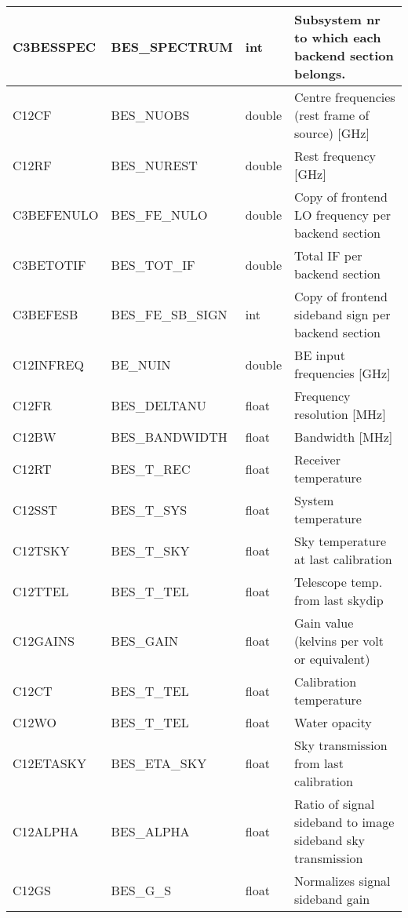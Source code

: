 \documentclass[twoside,11pt,nolof]{starlink}
\begin{document}
\begin {longtable}{|p{38mm}|p{42mm}|p{11mm}|p{55mm}|}
\hline \label{GSDVars:BESubsys}C3BESSPEC & BES\_SPECTRUM & int & Subsystem nr to which each backend section belongs.\\
\hline \label{GSDVars:centreFreqs}C12CF & BES\_NUOBS & double & Centre frequencies (rest frame of source) [GHz]\\
\hline \label{GSDVars:restFreqs}C12RF & BES\_NUREST & double & Rest frequency [GHz]\\
\hline \label{GSDVars:LOFreqs}C3BEFENULO & BES\_FE\_NULO & double & Copy of frontend LO frequency per backend section\\
\hline \label{GSDVars:totIFs}C3BETOTIF & BES\_TOT\_IF & double & Total IF per backend section\\
\hline \label{GSDVars:sbSigns}C3BEFESB & BES\_FE\_SB\_SIGN & int & Copy of frontend sideband sign per backend section\\
\hline \label{GSDVars:BEInputFreqs}C12INFREQ & BE\_NUIN & double & BE input frequencies [GHz]\\
\hline \label{GSDVars:freqRes}C12FR & BES\_DELTANU & float & Frequency resolution [MHz]\\
\hline \label{GSDVars:bandwidths}C12BW & BES\_BANDWIDTH & float & Bandwidth [MHz]\\
\hline \label{GSDVars:recTemps}C12RT & BES\_T\_REC & float & Receiver temperature\\
\hline \label{GSDVars:sourceSysTemps}C12SST & BES\_T\_SYS & float & System temperature\\
\hline \label{GSDVars:skyTemps}C12TSKY & BES\_T\_SKY & float & Sky temperature at last calibration\\
\hline \label{GSDVars:telTemps}C12TTEL & BES\_T\_TEL & float & Telescope temp. from last skydip\\
\hline \label{GSDVars:gains}C12GAINS & BES\_GAIN & float & Gain value (kelvins per volt or equivalent)\\
\hline \label{GSDVars:caltemps}C12CT & BES\_T\_TEL & float & Calibration temperature\\
\hline \label{GSDVars:opacities}C12WO & BES\_T\_TEL & float & Water opacity\\
\hline \label{GSDVars:skyTrans}C12ETASKY & BES\_ETA\_SKY & float & Sky transmission from last calibration\\
\hline \label{GSDVars:alphas}C12ALPHA & BES\_ALPHA & float & Ratio of signal sideband to image sideband sky transmission\\
\hline \label{GSDVars:sbGainNorms}C12GS & BES\_G\_S & float & Normalizes signal sideband gain\\

\end{longtable}
\end{document}
